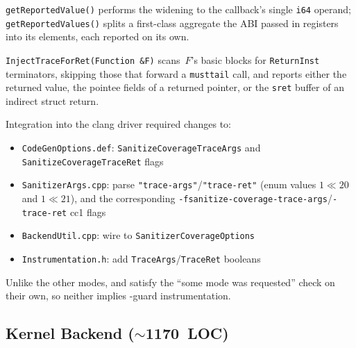 \documentclass{article}
\begin{document}
\texttt{getReportedValue()} performs the widening to the callback's single
\texttt{i64} operand; \texttt{getReportedValues()} splits a first-class
aggregate the ABI passed in registers into its elements, each reported on its
own.

\texttt{InjectTraceForRet(Function \&F)} scans~$F$'s basic blocks for
\texttt{ReturnInst} terminators, skipping those that forward a
\texttt{musttail} call, and reports either the returned value, the pointee
fields of a returned pointer, or the \texttt{sret} buffer of an indirect
struct return.

Integration into the clang driver required changes to:
\begin{itemize}[nosep]
  \item \texttt{CodeGenOptions.def}: \texttt{SanitizeCoverageTraceArgs} and
        \texttt{SanitizeCoverageTraceRet} flags
  \item \texttt{SanitizerArgs.cpp}: parse \texttt{"trace-args"}/\texttt{"trace-ret"}
        (enum values $1\ll20$ and $1\ll21$), and the corresponding
        \texttt{-fsanitize-coverage-trace-args}/\texttt{-trace-ret} cc1 flags
  \item \texttt{BackendUtil.cpp}: wire to \texttt{SanitizerCoverageOptions}
  \item \texttt{Instrumentation.h}: add \texttt{TraceArgs}/\texttt{TraceRet}
        booleans
\end{itemize}
Unlike the other \sancov{} modes, \traceargs{} and \traceret{} satisfy the
``some mode was requested'' check on their own, so neither implies
\tracepc{}-guard instrumentation.

\subsection{Kernel Backend ($\sim$1170~LOC)}
\end{document}
